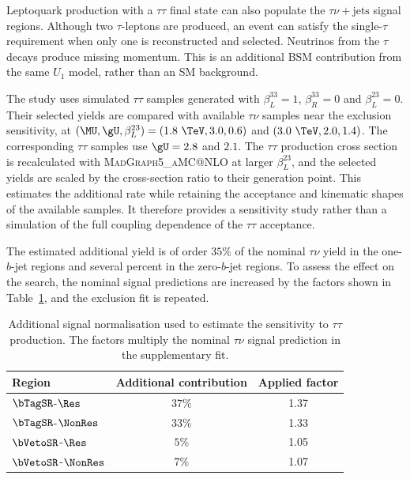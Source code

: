 Leptoquark production with a $\tau\tau$ final state can also populate the $\tau\nu+\mathrm{jets}$ signal regions.
Although two $\tau$-leptons are produced, an event can satisfy the single-$\tau$ requirement when only one is reconstructed and selected.
Neutrinos from the $\tau$ decays produce missing momentum.
This is an additional BSM contribution from the same $U_1$ model, rather than an SM background.

The study uses simulated $\tau\tau$ samples generated with $\beta_L^{33}=1$, $\beta_R^{33}=0$ and $\beta_L^{23}=0$.
Their selected yields are compared with available $\tau\nu$ samples near the exclusion sensitivity, at $(\MU,\gU,\beta_L^{23})=(1.8~\TeV,3.0,0.6)$ and $(3.0~\TeV,2.0,1.4)$.
The corresponding $\tau\tau$ samples use $\gU=2.8$ and $2.1$.
The $\tau\tau$ production cross section is recalculated with \textsc{MadGraph5\_aMC@NLO} at larger $\beta_L^{23}$, and the selected yields are scaled by the cross-section ratio to their generation point.
This estimates the additional rate while retaining the acceptance and kinematic shapes of the available samples.
It therefore provides a sensitivity study rather than a simulation of the full coupling dependence of the $\tau\tau$ acceptance.

The estimated additional yield is of order $35\%$ of the nominal $\tau\nu$ yield in the one-$b$-jet regions and several percent in the zero-$b$-jet regions.
To assess the effect on the search, the nominal signal predictions are increased by the factors shown in Table~\ref{tab:ch7_tautau_contamination}, and the exclusion fit is repeated.

\begin{table}[htbp]
    \centering
    \caption{Additional signal normalisation used to estimate the sensitivity to $\tau\tau$ production. The factors multiply the nominal $\tau\nu$ signal prediction in the supplementary fit.}
    \label{tab:ch7_tautau_contamination}
    \begin{tabular}{lcc}
        \toprule
        Region & Additional contribution & Applied factor \\
        \midrule
        $\bTagSR$-$\Res$ & $37\%$ & 1.37 \\
        $\bTagSR$-$\NonRes$ & $33\%$ & 1.33 \\
        $\bVetoSR$-$\Res$ & $5\%$ & 1.05 \\
        $\bVetoSR$-$\NonRes$ & $7\%$ & 1.07 \\
        \bottomrule
    \end{tabular}
\end{table}

